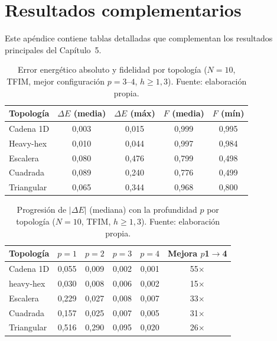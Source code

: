 \documentclass[11pt,a4paper,spanish]{book}
\begin{document}

\chapter{Resultados complementarios}
\label{app:results}

Este apéndice contiene tablas detalladas que complementan los resultados principales del Capítulo~5.

\begin{table}[h]
\centering
\caption[Error energético absoluto y fidelidad por topología]{Error energético absoluto y fidelidad por topología ($N = 10$, TFIM, mejor configuración $p=3$--$4$, $h \geq 1,3$). Fuente: elaboración propia.}
\label{tab:cross_topo_de}
\begin{tabular}{lcccc}
\toprule
\textbf{Topología} & \textbf{$\Delta E$ (media)} & \textbf{$\Delta E$ (máx)} & \textbf{$F$ (media)} & \textbf{$F$ (mín)} \\
\midrule
Cadena 1D & 0,003 & 0,015 & 0,999 & 0,995 \\
Heavy-hex & 0,010 & 0,044 & 0,997 & 0,984 \\
Escalera & 0,080 & 0,476 & 0,799 & 0,498 \\
Cuadrada & 0,089 & 0,240 & 0,776 & 0,499 \\
Triangular & 0,065 & 0,344 & 0,968 & 0,800 \\
\bottomrule
\end{tabular}
\end{table}

\begin{table}[h]
\centering
\caption[Progresión del error absoluto con la profundidad]{Progresión de $|\Delta E|$ (mediana) con la profundidad $p$ por topología ($N = 10$, TFIM, $h \geq 1,3$). Fuente: elaboración propia.}
\label{tab:delta_e_vs_p}
\begin{tabular}{lccccc}
\toprule
\textbf{Topología} & \textbf{$p = 1$} & \textbf{$p = 2$} & \textbf{$p = 3$} & \textbf{$p = 4$} & \textbf{Mejora $p$1$\to$4} \\
\midrule
Cadena 1D   & 0,055 & 0,009 & 0,002 & 0,001 & 55$\times$ \\
heavy-hex   & 0,030 & 0,008 & 0,006 & 0,002 & 15$\times$ \\
Escalera    & 0,229 & 0,027 & 0,008 & 0,007 & 33$\times$ \\
Cuadrada    & 0,157 & 0,025 & 0,007 & 0,005 & 31$\times$ \\
Triangular  & 0,516 & 0,290 & 0,095 & 0,020 &  26$\times$ \\
\bottomrule
\end{tabular}
\end{table}
\end{document}
